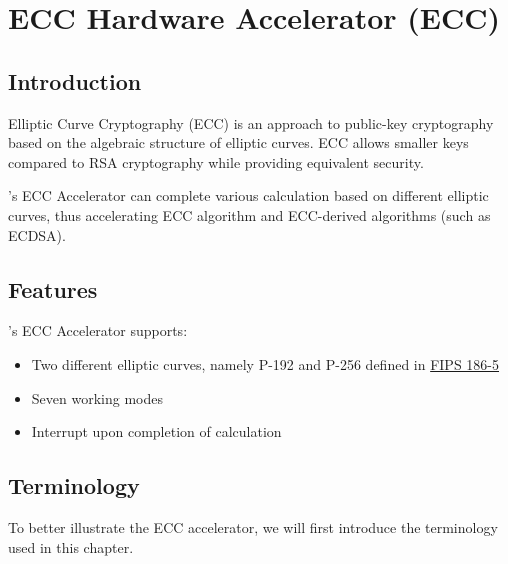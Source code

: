 \documentclass[main\_\_EN.tex]{subfiles}
\begin{document}

\ifglobal
\else
    {\let\clearpage\relax \listoftodos}
    {\let\clearpage\relax \listofdonetodos}
    \tableofcontents
\fi




\hypertarget{ecc}{}
\chapter{ECC Hardware Accelerator (ECC)}
\label{mod:ecc}


\section{Introduction}

Elliptic Curve Cryptography (ECC) is an approach to public-key cryptography based on the algebraic structure of elliptic curves. ECC allows smaller keys compared to RSA cryptography while providing equivalent security.

\chipname{}'s ECC Accelerator can complete various calculation based on different elliptic curves, thus accelerating ECC algorithm and ECC-derived algorithms (such as ECDSA).

\section{Features}
\chipname{}'s ECC Accelerator supports:
\begin{itemize}
    \item Two different elliptic curves, namely P-192 and P-256 defined in \href{https://nvlpubs.nist.gov/nistpubs/FIPS/NIST.FIPS.186-5.pdf}{FIPS 186-5}
    \item Seven working modes
    \item Interrupt upon completion of calculation
\end{itemize}

\section{Terminology}
To better illustrate the ECC accelerator, we will first introduce the terminology used in this chapter.
\end{document}
